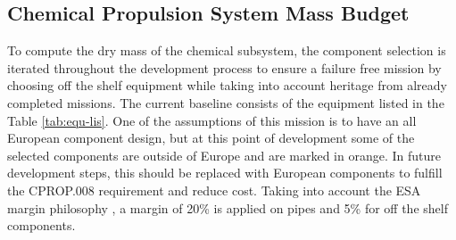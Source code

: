 \documentclass[conference]{IEEEtran}
\begin{document}
\subsection{Chemical Propulsion System Mass Budget}

To compute the dry mass of the chemical subsystem, the component selection is iterated throughout the development process to ensure a failure free mission by choosing off the shelf equipment while taking into account heritage from already completed missions. The current baseline consists of the equipment listed in the Table \ref{tab:equ-lis}. One of the assumptions of this mission is to have an all European component design, but at this point of development some of the selected components are outside of Europe and are marked in orange. In future development steps, this should be replaced with European components to fulfill the CPROP.008 requirement and reduce cost. Taking into account the ESA margin philosophy \cite{ESA.2012}, a margin of 20\% is applied on pipes and 5\% for off the shelf components.

\vspace*{\fill}
\end{document}
